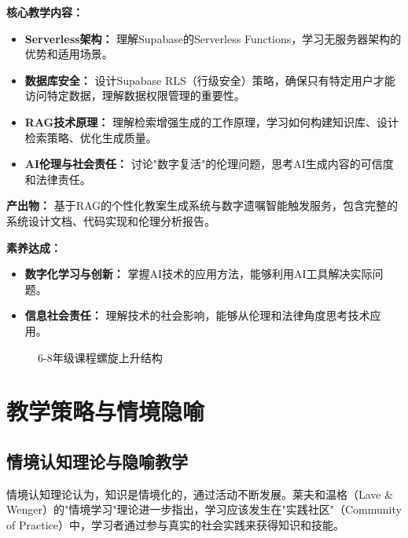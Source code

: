\documentclass[12pt,a4paper,fontset=fandol]{ctexart}
\begin{document}
\textbf{核心教学内容：}
\begin{itemize}
    \item \textbf{Serverless架构：} 理解Supabase的Serverless Functions，学习无服务器架构的优势和适用场景。
    \item \textbf{数据库安全：} 设计Supabase RLS（行级安全）策略，确保只有特定用户才能访问特定数据，理解数据权限管理的重要性。
    \item \textbf{RAG技术原理：} 理解检索增强生成的工作原理，学习如何构建知识库、设计检索策略、优化生成质量。
    \item \textbf{AI伦理与社会责任：} 讨论"数字复活"的伦理问题，思考AI生成内容的可信度和法律责任。
\end{itemize}

\textbf{产出物：} 基于RAG的个性化教案生成系统与数字遗嘱智能触发服务，包含完整的系统设计文档、代码实现和伦理分析报告。

\textbf{素养达成：}
\begin{itemize}
    \item \textbf{数字化学习与创新：} 掌握AI技术的应用方法，能够利用AI工具解决实际问题。
    \item \textbf{信息社会责任：} 理解技术的社会影响，能够从伦理和法律角度思考技术应用。
\end{itemize}

\begin{figure}[H]
    \centering
    \caption{6-8年级课程螺旋上升结构}
    \label{fig:spiral}
\end{figure}

\section{教学策略与情境隐喻}
\subsection{情境认知理论与隐喻教学}
情境认知理论认为，知识是情境化的，通过活动不断发展\cite{brown1989}。莱夫和温格（Lave \& Wenger）的"情境学习"理论进一步指出，学习应该发生在"实践社区"（Community of Practice）中，学习者通过参与真实的社会实践来获得知识和技能\cite{lave1991}。
\end{document}
